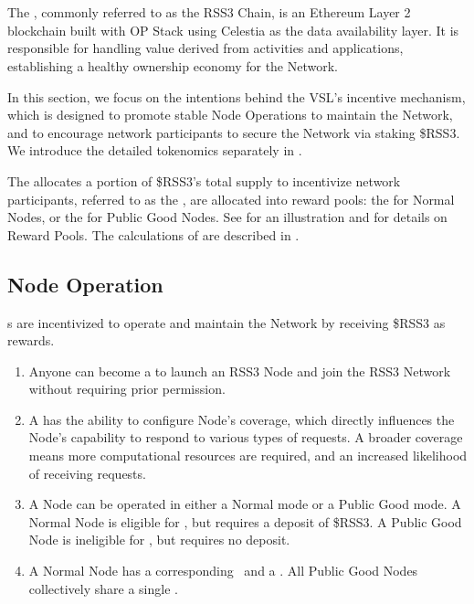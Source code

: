 \section{}
\label{sec:VSL}

The , commonly referred to as the RSS3 Chain, is an Ethereum Layer 2 blockchain built with OP Stack using Celestia as the data availability layer.
It is responsible for handling value derived from  activities and applications, establishing a healthy ownership economy for the Network.

In this section, we focus on the intentions behind the \gls{VSL}'s incentive mechanism, which is designed to promote stable Node Operations to maintain the Network, and to encourage network participants to secure the Network via staking \$RSS3.
We introduce the detailed tokenomics separately in .

The  allocates a portion of \$RSS3's total supply to incentivize network participants, referred to as the ,
are allocated into reward pools: the  for Normal Nodes, or the  for Public Good Nodes.
See  for an illustration and  for details on Reward Pools.
The calculations of  are described in .

\subsection{Node Operation}
s are incentivized to operate and maintain the Network by receiving \$RSS3 as rewards.
\begin{enumerate}
    \item Anyone can become a  to launch an RSS3 Node and join the RSS3 Network without requiring prior permission.
    \item A  has the ability to configure Node's coverage, which directly influences the Node's capability to respond to various types of requests. A broader coverage means more computational resources are required, and an increased likelihood of receiving requests.
    \item A Node can be operated in either a Normal mode or a Public Good mode. A Normal Node is eligible for , but requires a deposit of \$RSS3. A Public Good Node is ineligible for , but requires no deposit.
    \item A Normal Node has a corresponding \operationPool\ and a \stakingPool. All Public Good Nodes collectively share a single \publicGoodPool.
\end{enumerate}

